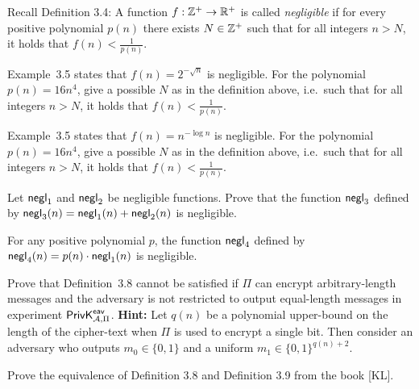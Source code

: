 \documentclass[a4paper,10pt,landscape,twocolumn]{scrartcl}
\begin{document}
\begin{exercise}
Recall Definition 3.4: A function $f: \mathbb{Z}^+ \rightarrow \mathbb{R}^+$ is called \emph{negligible} if for
every positive polynomial $p(n)$ there exists $N \in \mathbb{Z}^+$ such that for all integers $n> N$, it holds that $f(n) < \frac{1}{p(n)}$.

\begin{subex}
Example~3.5 states that $f(n) = 2^{-\sqrt{n}}$ is negligible. For the polynomial $p(n)=16 n^4$, give a possible $N$ as in the definition above, i.e.\ such that for all integers $n > N$, it holds that $f(n) < \frac{1}{p(n)}$.
\end{subex}

\begin{subex}
Example~3.5 states that $f(n) = n^{-\log{n}}$ is negligible. For the polynomial $p(n)=16 n^4$, give a possible $N$ as in the definition above, i.e.\ such that for all integers $n > N$, it holds that $f(n) < \frac{1}{p(n)}$.
\end{subex}

\begin{subex**}
Let $\mathsf{negl}_1$ and $\mathsf{negl}_2$ be negligible functions. Prove that the function $\mathsf{negl}_3$ defined by $\mathsf{negl}_3(n) = \mathsf{negl}_1(n)+\mathsf{negl}_2(n)$ is negligible.
\end{subex**}

\begin{subex**}
For any positive polynomial $p$, the function $\mathsf{negl}_4$ defined
  by $\mathsf{negl}_4(n) = p(n) \cdot \mathsf{negl}_1(n)$ is negligible.
\end{subex**}

\end{exercise}

\begin{exercise}
Prove that Definition~3.8 cannot be
  satisfied if $\Pi$ can encrypt arbitrary-length messages and the
  adversary is not restricted to output equal-length messages in
  experiment $\mathsf{PrivK}^{\mathsf{eav}}_{\mathcal{A},\Pi}$. \textbf{ Hint:} Let $q(n)$
  be a polynomial upper-bound on the length of the cipher-text when
  $\Pi$ is used to encrypt a single bit. Then consider an adversary
  who outputs $m_0 \in \{0, 1\}$ and a uniform $m_1 \in \{0, 1\}^{q(n)+2}$.
\end{exercise}


\begin{exercise}
Prove the equivalence of Definition 3.8 and Definition 3.9 from the book [KL].
\end{exercise}
  
\end{document}
